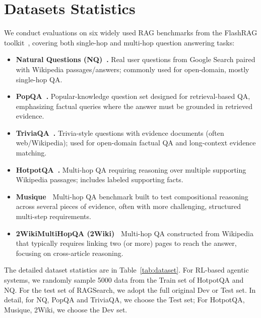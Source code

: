 \section{Datasets Statistics}
\label{app:a}
We conduct evaluations on six widely used RAG benchmarks from the FlashRAG toolkit~\cite{FlashRAG}, covering both single-hop and multi-hop question answering tasks:
\begin{itemize}
    \item \textbf{Natural Questions (NQ)~\cite{nq}.} Real user questions from Google Search paired with Wikipedia passages/answers; commonly used for open-domain, mostly single-hop QA.
    \item \textbf{PopQA~\cite{popqa}.} Popular-knowledge question set designed for retrieval-based QA, emphasizing factual queries where the answer must be grounded in retrieved evidence.
    \item \textbf{TriviaQA~\cite{triviaqa}.} Trivia-style questions with evidence documents (often web/Wikipedia); used for open-domain factual QA and long-context evidence matching.
    \item \textbf{HotpotQA~\cite{hotpotqa}.} Multi-hop QA requiring reasoning over multiple supporting Wikipedia passages; includes labeled supporting facts.
    \item \textbf{Musique~\cite{musique}} Multi-hop QA benchmark built to test compositional reasoning across several pieces of evidence, often with more challenging, structured multi-step requirements.
    \item \textbf{2WikiMultiHopQA (2Wiki)~\cite{2wiki}} Multi-hop QA constructed from Wikipedia that typically requires linking two (or more) pages to reach the answer, focusing on cross-article reasoning.
\end{itemize}
The detailed dataset statistics are in Table~\ref{tab:dataset}. For RL-based agentic systems, we randomly sample 5000 data from the Train set of HotpotQA and NQ. For the test set of RAGSearch, we adopt the full original Dev or Test set. In detail, for NQ, PopQA and TriviaQA, we choose the Test set; For HotpotQA, Musique, 2Wiki, we choose the Dev set.
